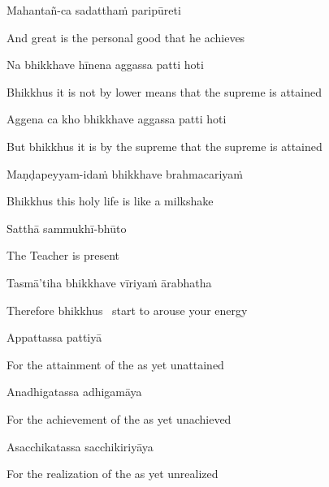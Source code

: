 Mahantañ-ca sadatthaṁ paripūreti

\begin{english}
  And great is the personal good that he achieves
\end{english}

Na bhikkhave hīnena aggassa patti hoti

\begin{english}
  Bhikkhus it is not by lower means that the supreme is attained
\end{english}

Aggena ca kho bhikkhave aggassa patti hoti

\begin{english}
  But bhikkhus it is by the supreme that the supreme is attained
\end{english}

Maṇḍapeyyam-idaṁ bhikkhave brahmacariyaṁ

\begin{english}
  Bhikkhus this holy life is like a milkshake
\end{english}

Satthā sammukhī-bhūto

\begin{english}
  The Teacher is present
\end{english}

Tasmā’tiha bhikkhave vīriyaṁ ārabhatha

\begin{english}
  Therefore bhikkhus \breathmark\ start to arouse your energy
\end{english}

Appattassa pattiyā

\begin{english}
  For the attainment of the as yet unattained
\end{english}

Anadhigatassa adhigamāya

\begin{english}
  For the achievement of the as yet unachieved
\end{english}

Asacchikatassa sacchikiriyāya

\begin{english}
  For the realization of the as yet unrealized
\end{english}

